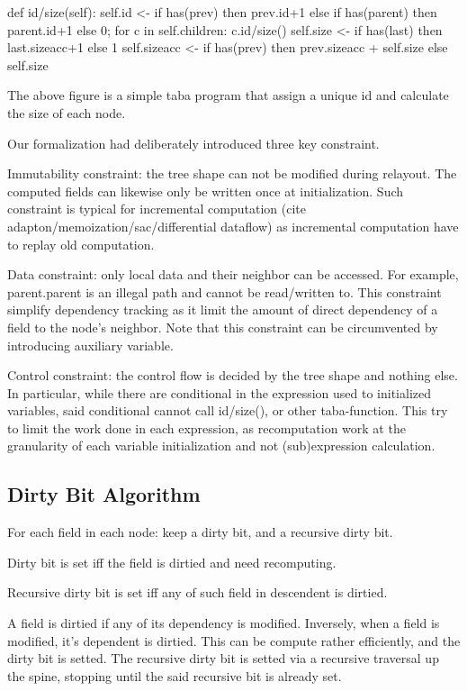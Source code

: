 \documentclass[format=acmsmall, review=false, screen=true]{acmart}
\begin{document}
def id/size(self):
  self.id <-
    if has(prev) then prev.id+1
    else if has(parent) then parent.id+1
    else 0;
  for c in self.children:
    c.id/size()
  self.size <-
    if has(last) then last.sizeacc+1
    else 1
  self.sizeacc <-
    if has(prev) then prev.sizeacc + self.size
    else self.size

The above figure is a simple taba program that assign a unique id and calculate the size of each node.

Our formalization had deliberately introduced three key constraint.

Immutability constraint: the tree shape can not be modified during relayout. The computed fields can likewise only be written once at initialization. Such constraint is typical for incremental computation (cite adapton/memoization/sac/differential dataflow) as incremental computation have to replay old computation. 

Data constraint: only local data and their neighbor can be accessed. For example, parent.parent is an illegal path and cannot be read/written to. This constraint simplify dependency tracking as it limit the amount of direct dependency of a field to the node's neighbor. Note that this constraint can be circumvented by introducing auxiliary variable.

Control constraint: the control flow is decided by the tree shape and nothing else. In particular, while there are conditional in the expression used to initialized variables, said conditional cannot call id/size(), or other taba-function. This try to limit the work done in each expression, as recomputation work at the granularity of each variable initialization and not (sub)expression calculation.

\subsection{Dirty Bit Algorithm}
For each field in each node: keep a dirty bit, and a recursive dirty bit.

Dirty bit is set iff the field is dirtied and need recomputing.

Recursive dirty bit is set iff any of such field in descendent is dirtied.

A field is dirtied if any of its dependency is modified. Inversely, when a field is modified, it's dependent is dirtied. This can be compute rather efficiently, and the dirty bit is setted. The recursive dirty bit is setted via a recursive traversal up the spine, stopping until the said recursive bit is already set.
\end{document}
